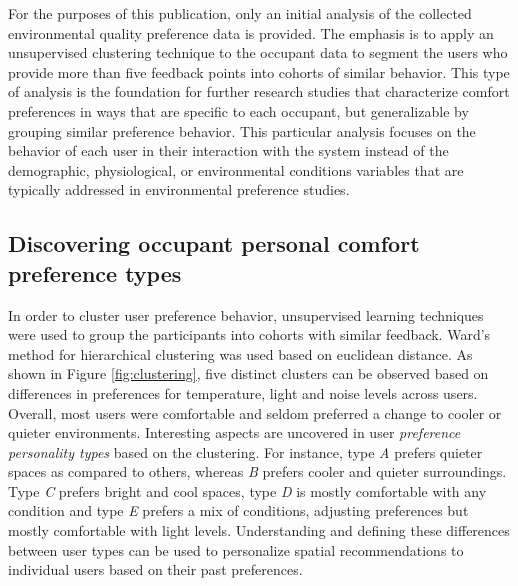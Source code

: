 
For the purposes of this publication, only an initial analysis of the collected environmental quality preference data is provided. The emphasis is to apply an unsupervised clustering technique to the occupant data to segment the users who provide more than five feedback points into cohorts of similar behavior. This type of analysis is the foundation for further research studies that characterize comfort preferences in ways that are specific to each occupant, but generalizable by grouping similar preference behavior. This particular analysis focuses on the behavior of each user in their interaction with the system instead of the demographic, physiological, or environmental conditions variables that are typically addressed in environmental preference studies. 

\subsection{Discovering occupant personal comfort preference types}
 In order to cluster user preference behavior, unsupervised learning techniques were used to group the participants into cohorts with similar feedback. Ward's method for hierarchical clustering was used based on euclidean distance. As shown in Figure \ref{fig:clustering}, five distinct clusters can be observed based on differences in preferences for temperature, light and noise levels across users.  Overall, most users were comfortable and seldom preferred a change to cooler or quieter environments. Interesting aspects are uncovered in user \emph{preference personality types} based on the clustering. For instance, type \emph{A} prefers quieter spaces as compared to others, whereas \emph{B} prefers cooler and quieter surroundings. Type \emph{C} prefers bright and cool spaces, type \emph{D} is mostly comfortable with any condition and type \emph{E} prefers a mix of conditions, adjusting preferences but mostly comfortable with light levels. Understanding and defining these differences between user types can be used to personalize spatial recommendations to individual users based on their past preferences. 




